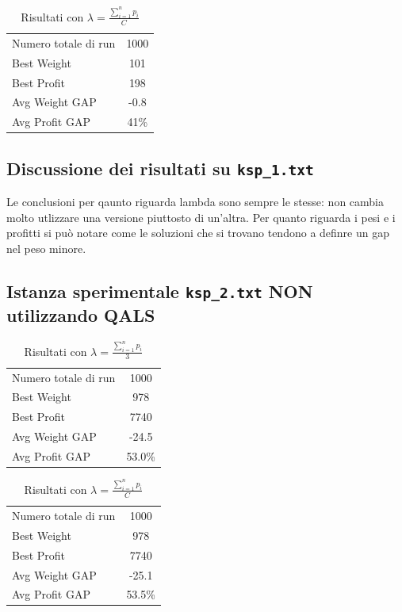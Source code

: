 \documentclass[a4paper,12pt]{article}
\begin{document}
\begin{table}[h!]
\centering
\begin{tabular}{lc}
\toprule
Numero totale di run & 1000 \\
Best Weight & 101 \\
Best Profit & 198 \\
Avg Weight GAP & -0.8 \\
Avg Profit GAP & 41\% \\
\bottomrule
\end{tabular}
\caption{Risultati con $\lambda = \displaystyle \frac{\sum_{i=1}^{n} p_i}{C}$}
\end{table}

\subsection*{Discussione dei risultati su \texttt{ksp\_1.txt}}
Le conclusioni per qaunto riguarda lambda sono sempre le stesse: non cambia molto utlizzare
una versione piuttosto di un'altra.
Per quanto riguarda i pesi e i profitti si può notare come le soluzioni che si trovano 
tendono a definre un gap nel peso minore.

\subsection*{Istanza sperimentale \texttt{ksp\_2.txt} NON utilizzando QALS}

\begin{table}[h!]
\centering
\begin{tabular}{lc}
\toprule
Numero totale di run & 1000 \\
Best Weight & 978 \\
Best Profit & 7740 \\
Avg Weight GAP & -24.5 \\
Avg Profit GAP & 53.0\% \\
\bottomrule
\end{tabular}
\caption{Risultati con $\lambda = \displaystyle \frac{\sum_{i=1}^{n} p_i}{3}$}
\end{table}

\begin{table}[h!]
\centering
\begin{tabular}{lc}
\toprule
Numero totale di run & 1000 \\
Best Weight & 978 \\
Best Profit & 7740 \\
Avg Weight GAP & -25.1 \\
Avg Profit GAP & 53.5\% \\
\bottomrule
\end{tabular}
\caption{Risultati con $\lambda = \displaystyle \frac{\sum_{i=1}^{n} p_i}{C}$}
\end{table}
\end{document}
